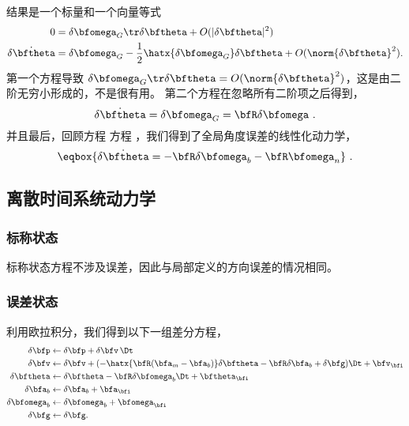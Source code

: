 %
结果是一个标量和一个向量等式
%
\begin{subequations}
%
\begin{align}
0 &= \delta\bfomega_G\tr\delta\bftheta + O(|\delta\bftheta|^2) \\
\dot{\delta\bftheta} &= \delta\bfomega_G - \frac{1}{2}\hatx{\delta\bfomega_G}\delta\bftheta + O(\norm{\delta\bftheta}^2).
\end{align}%
\end{subequations}
%
第一个方程导致 $\delta\bfomega_G\tr\delta\bftheta = O(\norm{\delta\bftheta}^2)$，这是由二阶无穷小形成的，不是很有用。 
第二个方程在忽略所有二阶项之后得到，
%
\begin{equation}
\dot{\delta\bftheta} = \delta\bfomega_G = \bfR\delta\bfomega ~.
\end{equation}%
%
并且最后，回顾方程 %
方程 ，我们得到了全局角度误差的线性化动力学，
%
\begin{equation}
\eqbox{\dot{\delta\bftheta} = - \bfR\delta\bfomega_b - \bfR\bfomega_n}\ .
\end{equation}%

\subsection{离散时间系统动力学}
\subsubsection{标称状态}
标称状态方程不涉及误差，因此与局部定义的方向误差的情况相同。 

\subsubsection{误差状态}

利用欧拉积分，我们得到以下一组差分方程，
%
\begin{subequations}
%
\begin{align}
\delta\bfp &\gets \delta\bfp + \delta\bfv\,\Dt \\
\delta\bfv &\gets \delta\bfv + (-\hatx{\bfR(\bfa_{m}-\bfa_{b})}\delta\bftheta - \bfR\delta\bfa_{b} + \delta\bfg)\Dt + \bfv_\bfi \\
\delta\bftheta &\gets \delta\bftheta - \bfR\delta\bfomega_{b} \Dt + \bftheta_\bfi \\
\delta\bfa_{b} &\gets  \delta\bfa_{b} + \bfa_\bfi \\
\delta\bfomega_{b} &\gets \delta\bfomega_{b} + \bfomega_\bfi \\
\delta\bfg &\gets \delta\bfg .
\end{align}%
\end{subequations}


